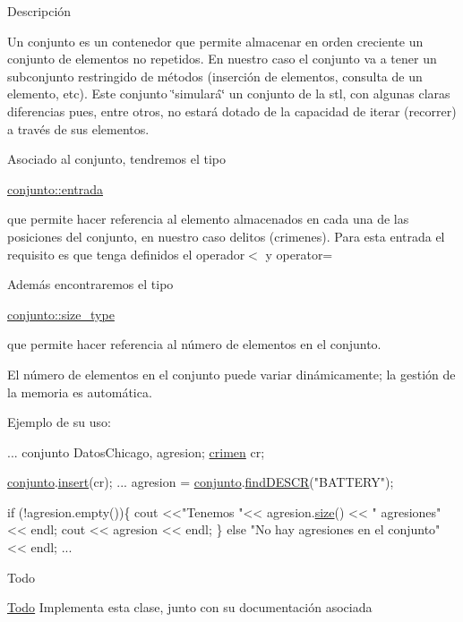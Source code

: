 Descripción

Un conjunto es un contenedor que permite almacenar en orden creciente un conjunto de elementos no repetidos. En nuestro caso el conjunto va a tener un subconjunto restringido de métodos (inserción de elementos, consulta de un elemento, etc). Este conjunto \char`\"{}simulará\char`\"{} un conjunto de la stl, con algunas claras diferencias pues, entre otros, no estará dotado de la capacidad de iterar (recorrer) a través de sus elementos.

Asociado al conjunto, tendremos el tipo
\begin{DoxyCode}
\hyperlink{classcrimen}{conjunto::entrada} 
\end{DoxyCode}
 que permite hacer referencia al elemento almacenados en cada una de las posiciones del conjunto, en nuestro caso delitos (crimenes). Para esta entrada el requisito es que tenga definidos el operador$<$ y operator=

Además encontraremos el tipo
\begin{DoxyCode}
\hyperlink{classconjunto_a855a5893bb0f5a851ab2dbf2b8aa6cc7}{conjunto::size\_type} 
\end{DoxyCode}
 que permite hacer referencia al número de elementos en el conjunto.

El número de elementos en el conjunto puede variar dinámicamente; la gestión de la memoria es automática.

Ejemplo de su uso\-: 
\begin{DoxyCode}
...
conjunto DatosChicago, agresion;
\hyperlink{classcrimen}{crimen} cr;

\hyperlink{classconjunto}{conjunto}.\hyperlink{classconjunto_aa65b9f7c4cb9bad6d4e40c1973095930}{insert}(cr);
...
agresion = \hyperlink{classconjunto}{conjunto}.\hyperlink{classconjunto_afff3e7f4b3d00f422dd7ab2fec935378}{findDESCR}(\textcolor{stringliteral}{"BATTERY"});

\textcolor{keywordflow}{if} (!agresion.empty())\{
 cout <<\textcolor{stringliteral}{"Tenemos "}<< agresion.\hyperlink{classconjunto_a533c699fbbbdcb8b9f8362f3b27cd9d7}{size}() << \textcolor{stringliteral}{" agresiones"} << endl;
 cout << agresion << endl;
\} \textcolor{keywordflow}{else} \textcolor{stringliteral}{"No hay agresiones en el conjunto"} << endl;
...
\end{DoxyCode}
 \begin{DoxyRefDesc}{Todo}
\item[\hyperlink{todo__todo000001}{Todo}]Implementa esta clase, junto con su documentación asociada \end{DoxyRefDesc}


